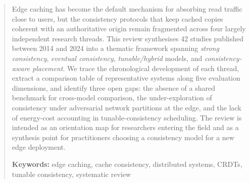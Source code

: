 \begin{abstract}
\noindent
Edge caching has become the default mechanism for absorbing read traffic close to users, but the
consistency protocols that keep cached copies coherent with an authoritative origin remain
fragmented across four largely independent research threads. This review synthesises 42 studies
published between 2014 and 2024 into a thematic framework spanning \emph{strong consistency},
\emph{eventual consistency}, \emph{tunable/hybrid} models, and \emph{consistency-aware placement}.
We trace the chronological development of each thread, extract a comparison table of representative
systems along five evaluation dimensions, and identify three open gaps: the absence of a shared
benchmark for cross-model comparison, the under-exploration of consistency under adversarial network
partitions at the edge, and the lack of energy-cost accounting in tunable-consistency scheduling.
The review is intended as an orientation map for researchers entering the field and as a synthesis
point for practitioners choosing a consistency model for a new edge deployment.

\vspace{0.6em}
\noindent\textbf{Keywords:} edge caching, cache consistency, distributed systems, CRDTs, tunable
consistency, systematic review
\end{abstract}
